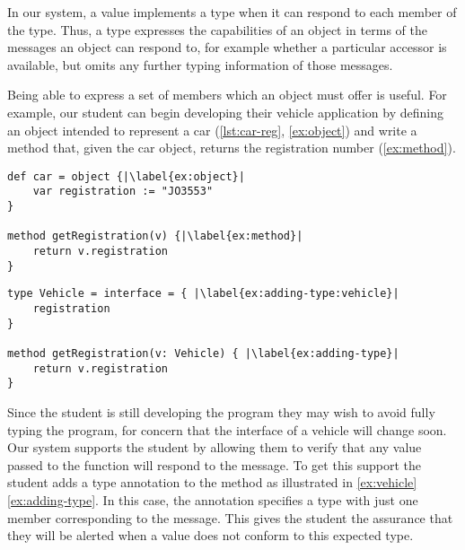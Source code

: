 In our system, a value implements a type when it
can respond to each member of the type.
Thus, a type expresses the capabilities
of an object in terms of the messages an object
can respond to, for example whether a particular accessor is
available, but omits any further typing information of those messages.

Being able to express a set of members which an object
must offer is useful. For example, our student can begin
developing their vehicle application
by defining an object
intended to represent a car (\cref{lst:car-reg}, \cref{ex:object}) and write a method that, 
given the car object,
returns the registration number (\cref{ex:method}).


\begin{lstlisting}[caption={The start of a simple program for tracking vehicle information.},label=lst:car-reg,escapechar=|,float,floatplacement=htbp]
def car = object {|\label{ex:object}|
    var registration := "JO3553"
}

method getRegistration(v) {|\label{ex:method}|
    return v.registration
}
\end{lstlisting}


\begin{lstlisting}[label={ex:vehicle},caption={Adding a type annotation to a method parameter.},escapechar=|,float,floatplacement=htbp]
type Vehicle = interface = { |\label{ex:adding-type:vehicle}|
    registration    
}

method getRegistration(v: Vehicle) { |\label{ex:adding-type}|
    return v.registration
}
\end{lstlisting}

Since the student is still developing the program they 
may wish to avoid fully typing the program,  
for concern that the interface of a vehicle will change soon. 
Our system supports the student by allowing them to verify
that any value passed to the  function will respond
to the  message.
To get this support the student adds a type annotation to the method 
as illustrated in \cref{ex:vehicle} \cref{ex:adding-type}. 
In this case, 
the annotation specifies a type with just one member
corresponding to the  message.
This gives the student the assurance that they will be alerted when a value 
does not conform to this expected type.


